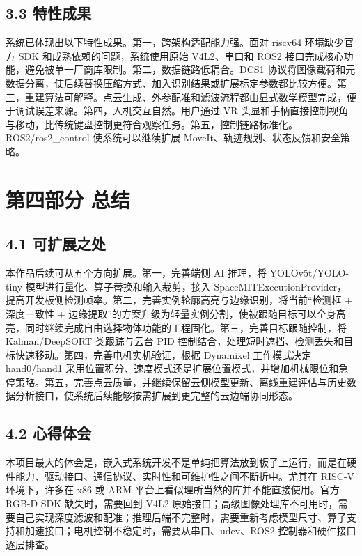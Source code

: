 \documentclass[UTF8,a4paper,zihao=-4]{ctexart}
\begin{document}
\subsection*{3.3 特性成果}

系统已体现出以下特性成果。第一，跨架构适配能力强。面对 riscv64 环境缺少官方 SDK 和成熟依赖的问题，系统使用原始 V4L2、串口和 ROS2 接口完成核心功能，避免被单一厂商库限制。第二，数据链路低耦合。DCS1 协议将图像载荷和元数据分离，使后续替换压缩方式、加入识别结果或扩展标定参数都比较方便。第三，重建算法可解释。点云生成、外参配准和滤波流程都由显式数学模型完成，便于调试误差来源。第四，人机交互自然。用户通过 VR 头显和手柄直接控制视角与移动，比传统键盘控制更符合观察任务。第五，控制链路标准化。ROS2/ros2\_control 使系统可以继续扩展 MoveIt、轨迹规划、状态反馈和安全策略。

\clearpage

\section*{第四部分 总结}

\subsection*{4.1 可扩展之处}

本作品后续可从五个方向扩展。第一，完善端侧 AI 推理，将 YOLOv5t/YOLO-tiny 模型进行量化、算子替换和输入裁剪，接入 SpaceMITExecutionProvider，提高开发板侧检测帧率。第二，完善实例轮廓高亮与边缘识别，将当前“检测框 + 深度一致性 + 边缘提取”的方案升级为轻量实例分割，使被跟随目标可以全身高亮，同时继续完成自由选择物体功能的工程固化。第三，完善目标跟随控制，将 Kalman/DeepSORT 类跟踪与云台 PID 控制结合，处理短时遮挡、检测丢失和目标快速移动。第四，完善电机实机验证，根据 Dynamixel 工作模式决定 hand0/hand1 采用位置积分、速度模式还是扩展位置模式，并增加机械限位和急停策略。第五，完善点云质量，并继续保留云侧模型更新、离线重建评估与历史数据分析接口，使系统后续能够按需扩展到更完整的云边端协同形态。

\subsection*{4.2 心得体会}

本项目最大的体会是，嵌入式系统开发不是单纯把算法放到板子上运行，而是在硬件能力、驱动接口、通信协议、实时性和可维护性之间不断折中。尤其在 RISC-V 环境下，许多在 x86 或 ARM 平台上看似理所当然的库并不能直接使用。官方 RGB-D SDK 缺失时，需要回到 V4L2 原始接口；高级图像处理库不可用时，需要自己实现深度滤波和配准；推理后端不完整时，需要重新考虑模型尺寸、算子支持和加速接口；电机控制不稳定时，需要从串口、udev、ROS2 控制器和硬件接口逐层排查。
\end{document}
